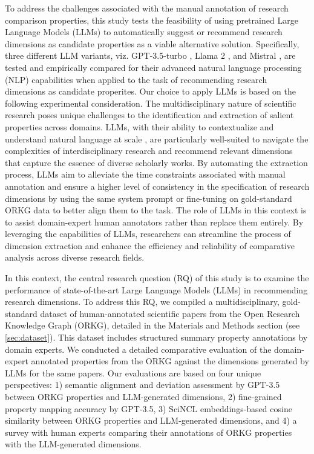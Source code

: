 To address the challenges associated with the manual annotation of research comparison properties, this study tests the feasibility of using pretrained Large Language Models (LLMs) to automatically suggest or recommend research dimensions as candidate properties as a viable alternative solution. Specifically, three different LLM variants, viz. GPT-3.5-turbo \cite{achiam2023gpt}, Llama 2 \cite{touvron2023llama}, and Mistral \cite{jiang2023mistral}, are tested and empirically compared for their advanced natural language processing (NLP) capabilities when applied to the task of recommending research dimensions as candidate properites. Our choice to apply LLMs is based on the following experimental consideration. The multidisciplinary nature of scientific research poses unique challenges to the identification and extraction of salient properties across domains. LLMs, with their ability to contextualize and understand natural language at scale \cite{harnad2024language,karanikolas2023large}, are particularly well-suited to navigate the complexities of interdisciplinary research and recommend relevant dimensions that capture the essence of diverse scholarly works. By automating the extraction process, LLMs aim to alleviate the time constraints associated with manual annotation and ensure a higher level of consistency in the specification of research dimensions by using the same system prompt or fine-tuning on gold-standard ORKG data to better align them to the task. The role of LLMs in this context is to assist domain-expert human annotators rather than replace them entirely. By leveraging the capabilities of LLMs, researchers can streamline the process of dimension extraction and enhance the efficiency and reliability of comparative analysis across diverse research fields. 

In this context, the central research question (RQ) of this study is to examine the performance of state-of-the-art Large Language Models (LLMs) in recommending research dimensions. To address this RQ, we compiled a multidisciplinary, gold-standard dataset of human-annotated scientific papers from the Open Research Knowledge Graph (ORKG), detailed in the Materials and Methods section (see \autoref{sec:dataset}). This dataset includes structured summary property annotations by domain experts. We conducted a detailed comparative evaluation of the domain-expert annotated properties from the ORKG against the dimensions generated by LLMs for the same papers. Our evaluations are based on four unique perspectives: 1) semantic alignment and deviation assessment by GPT-3.5 between ORKG properties and LLM-generated dimensions, 2) fine-grained property mapping accuracy by GPT-3.5, 3) SciNCL \cite{ostendorff2022neighborhood} embeddings-based cosine similarity between ORKG properties and LLM-generated dimensions, and 4) a survey with human experts comparing their annotations of ORKG properties with the LLM-generated dimensions.

